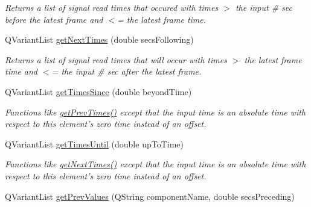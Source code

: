 \begin{DoxyCompactItemize}
\begin{DoxyCompactList}\small\item\em Returns a list of signal read times that occured with times $>$ the input \# sec before the latest frame and $<$= the latest frame time. \end{DoxyCompactList}\item 
Q\-Variant\-List \hyperlink{class_picto_1_1_analysis_signal_data_a54a1d9bca587763f184b06921eb92b29}{get\-Next\-Times} (double secs\-Following)
\begin{DoxyCompactList}\small\item\em Returns a list of signal read times that will occur with times $>$ the latest frame time and $<$= the input \# sec after the latest frame. \end{DoxyCompactList}\item 
\hypertarget{class_picto_1_1_analysis_signal_data_a4767c57096ddc284466c116917392d6e}{Q\-Variant\-List \hyperlink{class_picto_1_1_analysis_signal_data_a4767c57096ddc284466c116917392d6e}{get\-Times\-Since} (double beyond\-Time)}\label{class_picto_1_1_analysis_signal_data_a4767c57096ddc284466c116917392d6e}

\begin{DoxyCompactList}\small\item\em Functions like \hyperlink{class_picto_1_1_analysis_signal_data_a2f0d0631c8c6e8ae330fb86a4002007a}{get\-Prev\-Times()} except that the input time is an absolute time with respect to this element's zero time instead of an offset. \end{DoxyCompactList}\item 
\hypertarget{class_picto_1_1_analysis_signal_data_a4aca83b8d11e9547991221cac3cb606c}{Q\-Variant\-List \hyperlink{class_picto_1_1_analysis_signal_data_a4aca83b8d11e9547991221cac3cb606c}{get\-Times\-Until} (double up\-To\-Time)}\label{class_picto_1_1_analysis_signal_data_a4aca83b8d11e9547991221cac3cb606c}

\begin{DoxyCompactList}\small\item\em Functions like \hyperlink{class_picto_1_1_analysis_signal_data_a54a1d9bca587763f184b06921eb92b29}{get\-Next\-Times()} except that the input time is an absolute time with respect to this element's zero time instead of an offset. \end{DoxyCompactList}\item 
\hypertarget{class_picto_1_1_analysis_signal_data_a5531db7f4dffd88f6a95feb3d5e093e9}{Q\-Variant\-List \hyperlink{class_picto_1_1_analysis_signal_data_a5531db7f4dffd88f6a95feb3d5e093e9}{get\-Prev\-Values} (Q\-String component\-Name, double secs\-Preceding)}\label{class_picto_1_1_analysis_signal_data_a5531db7f4dffd88f6a95feb3d5e093e9}


\end{DoxyCompactItemize}
